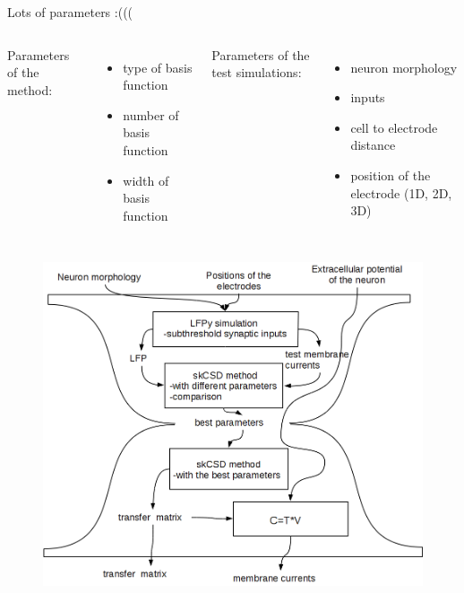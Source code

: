 \documentclass[11pt,a4paper,titlepage]{beamer}
\begin{document}
\begin{frame}{Lots of parameters :(((}
\begin{columns}
Parameters of the method:
\begin{itemize}
\item type of basis function
\item number of basis function
\item width of basis function
\end{itemize}
Parameters of the test simulations:
\begin{itemize}
\item neuron morphology
\item inputs
\item cell to electrode distance
\item position of the electrode (1D, 2D, 3D)

\end{itemize}
\end{columns}

\end{frame}






\begin{frame}
\begin{figure}
\includegraphics[height=8 cm]{plots/flow.png}
\end{figure}

\end{frame}
\end{document}

